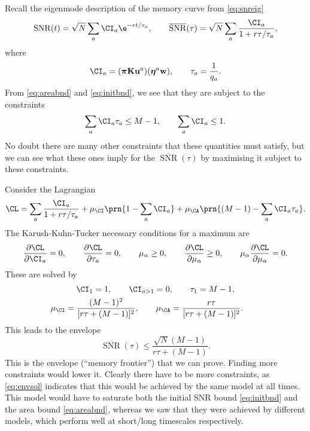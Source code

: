\documentclass[12pt]{article}
\newcommand{\eqm}{\pi}
\newcommand{\eq}{\boldsymbol{\eqm}}
\newcommand{\wm}{w}
\newcommand{\w}{\mathbf{\wm}}
\newcommand{\encm}{K}
\newcommand{\enc}{\mathbf{\encm}}
\newcommand{\evrm}{u}
\newcommand{\evr}{\mathbf{\evrm}}
\newcommand{\evlm}{\eta}
\newcommand{\evl}{\boldsymbol{\evlm}}
\DeclareMathOperator{\snr}{SNR}
\newcommand{\snrb}{\overline{\snr}}
\renewcommand{\pdiff}[2]{\frac{\partial #1}{\partial #2}}
\begin{document}
Recall the eigenmode description of the memory curve from \cref{eq:snreig}
%
\begin{equation*}
  \snr(t) = \sqrt{N} \sum_a \CI_a \e^{-rt/\tau_a},
  \qquad
  \snrb(\tau) = \sqrt{N} \sum_a \frac{\CI_a}{1+r\tau/\tau_a},
\end{equation*}
%
where
%
\begin{equation*}
  \CI_a = (\eq \enc \evr^a) (\evl^a \w),
  \qquad
  \tau_a = \frac{1}{q_a}.
\end{equation*}
%
From \eqref{eq:areabnd} and \eqref{eq:initbnd}, we see that they are subject to the constraints
%
\begin{equation}\label{eq:coeffconstr}
  \sum_a \CI_a \tau_a \leq M-1,
  \qquad
  \sum_a \CI_a \leq 1.
\end{equation}
%
No doubt there are many other constraints that these quantities must satisfy, but we can see what these ones imply for the \(\snrb(\tau)\) by maximising it subject to these constraints.

Consider the Lagrangian
%
\begin{equation}\label{eq:envlagrangian}
  \CL = \sum_a \frac{\CI_a}{1+r\tau/\tau_a} + \mu_\CI \prn{1 - \sum_a \CI_a} + \mu_\CA \prn{(M-1) - \sum_a \CI_a \tau_a}.
\end{equation}
%
The Karush-Kuhn-Tucker necessary conditions for a maximum are
%
\begin{equation}\label{eq:envKTcond}
  \pdiff{\CL}{\CI_a} = 0, \qquad
  \pdiff{\CL}{\tau_a} = 0, \qquad
  \mu_\alpha \geq 0, \qquad
  \pdiff{\CL}{\mu_\alpha} \geq 0, \qquad
  \mu_\alpha\pdiff{\CL}{\mu_\alpha} = 0.
\end{equation}
%
These are solved by
%
\begin{equation}\label{eq:envsol}
\begin{gathered}
  \CI_1 = 1, \qquad
  \CI_{a>1} = 0, \qquad
  \tau_1 = M-1, \\
  \mu_\CI = \frac{(M-1)^2}{[r\tau + (M-1)]^2}, \qquad
  \mu_\CA = \frac{r\tau}{[r\tau+(M-1)]^2}. \qquad
\end{gathered}
\end{equation}
%
This leads to the envelope
%
\begin{equation}\label{eq:env}
  \snrb(\tau) \leq \frac{\sqrt{N}(M-1)}{r\tau + (M-1)}.
\end{equation}
%
This is the envelope (``memory frontier'') that we can prove.
Finding more constraints would lower it.
Clearly there have to be more constraints, as \eqref{eq:envsol} indicates that this would be achieved by the same model at all times.
This model would have to saturate both the initial SNR bound \eqref{eq:initbnd} and the area bound \eqref{eq:areabnd}, whereas we saw that they were achieved by different models, which perform well at short/long timescales respectively.
\end{document}
